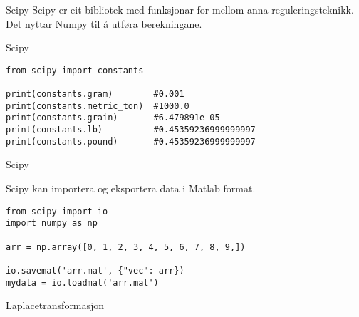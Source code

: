 \begin{frame}{Scipy}
  Scipy er eit bibliotek med funksjonar for mellom anna reguleringsteknikk. Det nyttar Numpy til å utføra berekningane.
  
\end{frame}


\begin{frame}[containsverbatim]{Scipy}

  \begin{verbatim}
from scipy import constants

print(constants.gram)        #0.001
print(constants.metric_ton)  #1000.0
print(constants.grain)       #6.479891e-05
print(constants.lb)          #0.45359236999999997
print(constants.pound)       #0.45359236999999997
  \end{verbatim}
\end{frame}

\begin{frame}[containsverbatim]{Scipy}

Scipy kan importera og eksportera data i Matlab format.
  
  \begin{verbatim}
from scipy import io
import numpy as np

arr = np.array([0, 1, 2, 3, 4, 5, 6, 7, 8, 9,])

io.savemat('arr.mat', {"vec": arr})
mydata = io.loadmat('arr.mat')
  \end{verbatim}
  
\end{frame}


\begin{frame}[containsverbatim]{Laplacetransformasjon}

  \begin{verbatim}
    
  \end{verbatim}
  
\end{frame}


